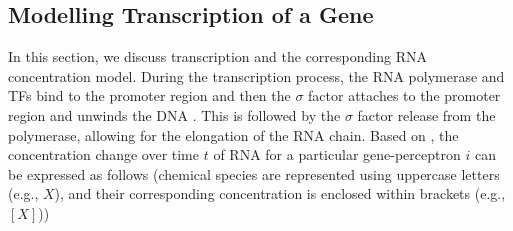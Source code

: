 \documentclass[twocolumn]{biophys-new}
\newcommand{\sm}[1]{\textcolor{brown}{#1}}
\begin{document}
{{%



\subsection*{Modelling Transcription of a Gene} \label{Modelling_Transcription_Gene}
In this section, we discuss  transcription and  the corresponding RNA concentration model.
During the transcription process, the RNA polymerase and TFs bind to the promoter region 
and then the $\sigma$ factor attaches to the promoter region and unwinds the DNA \cite{cao2020stochastic}. This is followed by the $\sigma$ factor release from the polymerase, allowing for the elongation of the RNA chain.
Based on \cite{santillan2008use}, the concentration change over time $t$ of RNA for a particular gene-perceptron $i$ can be expressed as follows (chemical species are represented using uppercase letters (e.g., $X$), and their corresponding concentration is enclosed within brackets (e.g., $[X]$)) 
 
}}
\end{document}
